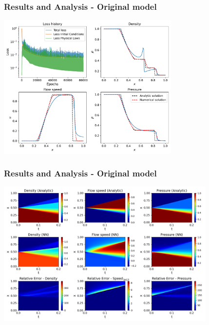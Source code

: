 \documentclass[aspectratio=169]{beamer}
\begin{document}
\begin{frame}\frametitle{Results and Analysis - Original model}
	
	\begin{center}
		\includegraphics[width=0.68\textwidth]{Figures/Figure_1.pdf}
	\end{center}	
\end{frame}


\begin{frame}\frametitle{Results and Analysis - Original model}
	
	\begin{center}
		\includegraphics[width=0.82\textwidth]{Figures/Figure_2.png}
	\end{center}	
\end{frame}
\end{document}
